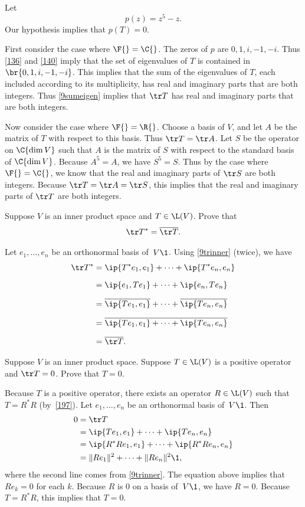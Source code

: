 \begin{Solution}
Let
\[
p(z) = z^5 - z.
\]
Our hypothesis implies that $p(T) = 0$.

First consider the case where $\F{} = \C{}$. The zeros of $p$ are $0, 1, i, -1, -i$. Thus \ref{136} and \ref{140} imply that the set of eigenvalues of $T$ is contained in $\br{0, 1, i, -1, -i}$. This implies that the sum of the eigenvalues of $T$, each included according to its multiplicity, has real and imaginary parts that are both integers. Thus \ref{9sumeigen} implies that $\tr T$ has real and imaginary parts that are both integers.

Now consider the case where $\F{} = \R{}$. Choose a basis of $V$, and let $A$ be the matrix of $T$ with respect to this basis. Thus $\tr T = \tr A$. Let $S$ be the operator on $\C {\dim V}$ such that $A$ is the matrix of $S$ with respect to the standard basis of $\C {\dim V}$. Because $A^5 = A$, we have $S^5 = S$. Thus by the case where $\F{} = \C{}$, we know that the real and imaginary parts of $\tr S$ are both integers. Because $\tr T = \tr A = \tr S$, this implies that the real and imaginary parts of $\tr T$ are both integers.
\end{Solution}

\exercise
Suppose $V$ is an inner product space and $T \in \L(V)$. Prove that \label{393}
\[
\tr T^* = \overline{\tr T}.
\]
\exercisedisplayend

\begin{Solution}
Let
$e_1, \dots, e_n$ be an orthonormal basis of~$V\1$.  Using \ref{9trinner} (twice), we have
\begin{align*}
\tr T^* &= \ip{T^* e_1, e_1} + \dots + \ip{T^* e_n, e_n} \\[6bp]
&= \ip{e_1, T e_1} + \dots + \ip{e_n, T e_n} \\[6bp]
&= \overline{\ip{T e_1, e_1}} + \dots + \overline{\ip{T e_n, e_n}} \\[6bp]
&= \overline{\ip{T e_1, e_1} + \dots + \ip{T e_n, e_n}} \\[6bp]
&= \overline{\tr T}.
\end{align*}
\end{Solution}

\exercise
Suppose $V$ is an inner product space.  Suppose $T \in \L(V)$ is a positive
operator and $\tr T = 0$. Prove that $T = 0$. \label{391}

\begin{Solution}
Because $T$ is a positive operator, there exists
an operator $R \in \L(V)$ such that $T = R^*R$ (by~\ref{197}).  Let
$e_1, \dots, e_n$ be an orthonormal basis of~$V\1$.  Then
\begin{align*}
0 &= \tr T \\
&= \ip{Te_1, e_1} + \dots + \ip{Te_n, e_n} \\
&= \ip{R^*Re_1, e_1} + \dots + \ip{R^*Re_n, e_n} \\
&= \|Re_1\|^2 + \dots + \|Re_n\|^2\1,
\end{align*}
where the second line comes from \ref{9trinner}. The equation above implies that $Re_k = 0$ for each $k$.  Because $R$ is $0$ on a
basis of~$V\1$, we have $R = 0$.  Because $T = R^*R$, this implies that $T = 0$.
\end{Solution}

